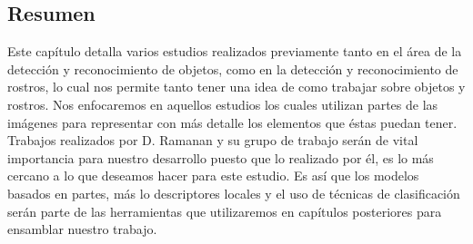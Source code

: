 \subsection{Resumen}
Este capítulo detalla varios estudios realizados previamente tanto en el área de la detección y reconocimiento de objetos, como en la detección y reconocimiento de rostros, lo cual nos permite tanto tener una idea de como trabajar sobre objetos y rostros. Nos enfocaremos en aquellos estudios los cuales utilizan partes de las imágenes para representar con más detalle los elementos que éstas puedan tener. Trabajos realizados por D. Ramanan y su grupo de trabajo serán de vital importancia para nuestro desarrollo puesto que lo realizado por él, es lo más cercano a lo que deseamos hacer para este estudio. Es así que los modelos basados en partes, más lo descriptores locales y el uso de técnicas de clasificación serán parte de las herramientas que utilizaremos en capítulos posteriores para ensamblar nuestro trabajo.